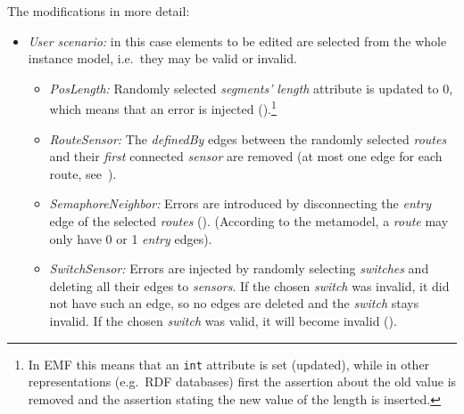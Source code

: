 The modifications in more detail:
\begin{itemize}
  \item \emph{User scenario:} in this case elements to be edited are selected from the whole instance model, i.e.\ they may be valid or invalid. 
  \begin{itemize}
    
    \item \emph{PosLength:} Randomly selected \emph{segments'} \emph{length} attribute is updated to 0, which means that an error is injected ().\footnote{In EMF this means that an \texttt{int} attribute is set (updated), while in other representations (e.g.\ RDF databases) first the assertion about the old value is removed and the assertion stating the new value of the length is inserted.}
    
    \item \emph{RouteSensor:} The \emph{definedBy} edges between the randomly selected \emph{routes} and their \emph{first} connected \emph{sensor} are removed (at most one edge for each route, see~).
    
    \item \emph{SemaphoreNeighbor:} Errors are introduced by disconnecting the \emph{entry} edge of the selected \emph{routes} (). (According to the metamodel, a \emph{route} may only have 0 or 1 \emph{entry} edges).

    \item \emph{SwitchSensor:} Errors are injected by randomly selecting \emph{switches} and deleting all their edges to \emph{sensors}. If the chosen \emph{switch} was invalid, it did not have such an edge, so no edges are deleted and the \emph{switch} stays invalid. If the chosen \emph{switch} was valid, it will become invalid ().
        
\end{itemize}
  

\end{itemize}
